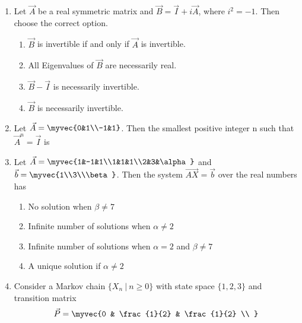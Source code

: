 \renewcommand{\theequation}{\theenumi}
\renewcommand{\thefigure}{\theenumi}
\renewcommand{\thetable}{\theenumi}
\begin{enumerate}[label=\thesection.\arabic*.,ref=\thesection.\theenumi]

\item Let $\vec{A}$ be a real symmetric matrix and  $\vec{B}=\vec{I}+i\vec{A}$, where $i^2=-1$. Then choose the correct option.
\begin{enumerate}
	\item  $\vec{B}$ is invertible if and only if $\vec{A}$ is invertible.
	\item All Eigenvalues of $\vec{B}$ are necessarily real.
	\item $\vec{B}-\vec{I}$ is necessarily invertible.
	\item $\vec{B}$ is necessarily invertible.
\end{enumerate}
%
\solution

\twocolumn
\item Let $\vec{A}=\myvec{0&1\\-1&1}$. Then the smallest positive integer n such that $\vec{A}^n=\vec{I}$ is
%
\\
\solution

%
\item Let $\vec{A} = \myvec{1&-1&1\\1&1&1\\2&3&\alpha}$ and $\vec{b}= \myvec{1\\3\\\beta}$. Then the system $\vec{AX}=\vec{b}$ over the real numbers has\\
\begin{enumerate}
    \item No solution when $\beta \ne 7$
    \item Infinite number of solutions when $\alpha \ne 2$
    \item Infinite number of solutions when $\alpha = 2$ and $\beta \ne 7$
    \item A unique solution if $\alpha \ne 2$
\end{enumerate}
%
\solution

%
\item Consider a Markov chain $\{X_n \: | \: n \geq 0\}$ with state space $\{1,2,3\}$ and transition matrix
\begin{align}
    \vec{P} = \myvec{0 & \frac{1}{2} & \frac{1}{2} \\
}
\end{align}
\end{enumerate}
